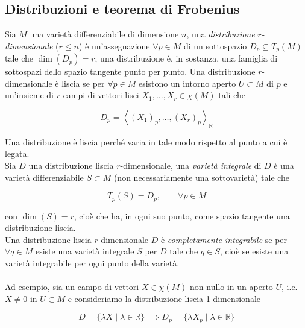 \subsection{Distribuzioni e teorema di Frobenius}

Sia $ M $ una varietà differenziabile di dimensione $ n $, una \textit{distribuzione} $ r $\textit{-dimensionale} ($ r \leqslant n $) è un'assegnazione $ \forall p \in M $ di un sottospazio $ D_{p} \subseteq T_{p}(M) $ tale che $ \dim(D_{p}) = r $; una distribuzione è, in sostanza, una famiglia di sottospazi dello spazio tangente punto per punto. Una distribuzione $ r $-dimensionale è liscia se per $ \forall p \in M $ esistono un intorno aperto $ U \subset M $ di $ p $ e un'insieme di $ r $ campi di vettori lisci $ X_{1},\dots,X_{r} \in \chi(M) $ tali che

\begin{equation}
	D_{p} = \left\langle (X_{1})_{p}, \dots, (X_{r})_{p} \right\rangle_{\mathbb{R}}
\end{equation}

Una distribuzione è liscia perché varia in tale modo rispetto al punto a cui è legata.\\
Sia $ D $ una distribuzione liscia $ r $-dimensionale, una \textit{varietà integrale} di $ D $ è una varietà differenziabile $ S \subset M $ (non necessariamente una sottovarietà) tale che

\begin{equation}
	T_{p}(S) = D_{p}, \qquad \forall p \in M
\end{equation}

con $ \dim(S) = r $, cioè che ha, in ogni suo punto, come spazio tangente una distribuzione liscia.\\
Una distribuzione liscia $ r $-dimensionale $ D $ è \textit{completamente integrabile} se per $ \forall q \in M $ esiste una varietà integrale $ S $ per $ D $ tale che $ q \in S $, cioè se esiste una varietà integrabile per ogni punto della varietà.\\\\
%
Ad esempio, sia un campo di vettori $ X \in \chi(M) $ non nullo in un aperto $ U $, i.e. $ X \neq 0 $ in $ U \subset M $ e consideriamo la distribuzione liscia 1-dimensionale

\begin{equation}
	D = \{ \lambda X \mid \lambda \in \mathbb{R} \} %
	\implies%
	D_{p} = \{ \lambda X_{p} \mid \lambda \in \mathbb{R} \}
\end{equation}

